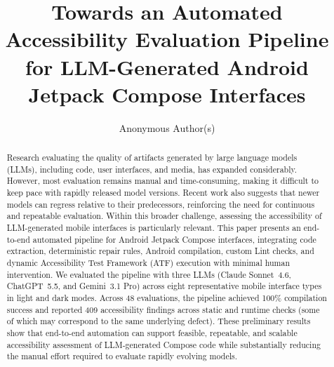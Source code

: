 \documentclass[sigconf,review]{webmedia}
\title{Towards an Automated Accessibility Evaluation Pipeline for
       LLM-Generated Android Jetpack Compose Interfaces}
\author{Anonymous Author(s)}
\affiliation{%
  \institution{Anonymous Institution}
  \country{}
}
\begin{document}
\begin{abstract}
Research evaluating the quality of artifacts generated by large language
models (LLMs), including code, user interfaces, and media, has expanded
considerably. However, most evaluation remains manual and time-consuming,
making it difficult to keep pace with rapidly released model versions. Recent
work also suggests that newer models can regress relative to their predecessors,
reinforcing the need for continuous and repeatable evaluation. Within this
broader challenge, assessing the accessibility of LLM-generated mobile
interfaces is particularly relevant. This paper presents an end-to-end
automated pipeline for Android Jetpack Compose interfaces, integrating code
extraction, deterministic repair rules, Android compilation, custom Lint
checks, and dynamic Accessibility Test Framework (ATF) execution with minimal
human intervention. We evaluated the pipeline with three LLMs (Claude
Sonnet~4.6, ChatGPT~5.5, and Gemini~3.1 Pro) across eight representative
mobile interface types in light and dark modes. Across 48 evaluations, the
pipeline achieved 100\% compilation success and reported 409 accessibility
findings across static and runtime checks (some of which may correspond to
the same underlying defect). These preliminary results show that end-to-end
automation can support feasible, repeatable, and scalable accessibility
assessment of LLM-generated Compose code while substantially reducing the
manual effort required to evaluate rapidly evolving models.
\end{abstract}

\maketitle
\end{document}
